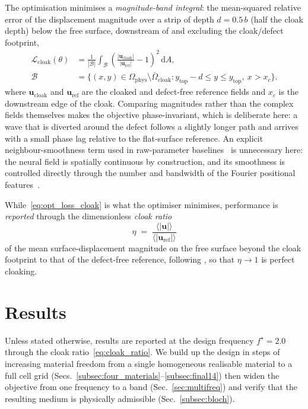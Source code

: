 \documentclass[preprint,12pt]{elsarticle}
\newcommand{\mbf}[1]{\mathbf{#1}}
\newcommand{\be}{\begin{equation}}
\newcommand{\ee}{\end{equation}}
\newcommand{\mcl}[1]{\mathcal{#1}}
\begin{document}
The optimisation minimises a
\emph{magnitude-band integral}: the mean-squared relative error of the
displacement magnitude over a strip of depth $d=0.5\,b$ (half the cloak
depth) below the free surface, downstream of and excluding the
cloak/defect footprint,
\begin{subequations}\label{eq:opt_loss_cloak}
\begin{align}
  \mcl{L}_{\mathrm{cloak}}(\theta)
  &= \frac{1}{|\mcl{B}|}\int_{\mcl{B}}
      \left(\frac{|\mbf{u}_{\mathrm{cloak}}|}{|\mbf{u}_{\mathrm{ref}}|}-1\right)^{2}
      \,\mathrm{d}A, \label{eq:opt_loss_cloak_L}\\
  \mcl{B}&=\bigl\{(x,y)\in\Omega_{\mathrm{phys}}\setminus\overline{\Omega}_{\mathrm{cloak}}
     : y_{\mathrm{top}}-d\le y\le y_{\mathrm{top}},\ x>x_c\bigr\}.
     \label{eq:opt_loss_cloak_B}
\end{align}
\end{subequations}
where $\mbf{u}_{\mathrm{cloak}}$ and $\mbf{u}_{\mathrm{ref}}$ are the
cloaked and defect-free reference fields and $x_c$ is the downstream edge
of the cloak. Comparing magnitudes rather than the complex fields
themselves makes the objective phase-invariant, which is deliberate here: a wave
that is diverted around the defect follows a slightly longer path and
arrives with a small phase lag relative to the flat-surface reference.
An explicit
neighbour-smoothness term used in raw-parameter
baselines~\citep{wang2022} is unnecessary here: the neural field is
spatially continuous by construction, and its smoothness is controlled
directly through the number and bandwidth of the Fourier positional
features~\citep{tancik2020fourier}.

While~\eqref{eq:opt_loss_cloak} is what the optimiser minimises, performance
is \emph{reported} through the dimensionless \emph{cloak ratio}
\be\label{eq:cloak_ratio}
  \eta \;=\;
  \frac{\langle|\mbf{u}|\rangle}{\langle|\mbf{u}_{\mathrm{ref}}|\rangle}
\ee
of the mean surface-displacement magnitude on the free surface beyond the
cloak footprint to that of the defect-free reference, following
\citet{chatzopoulos2023}, so that $\eta\to1$ is perfect cloaking.

\section{Results}\label{sec:results}

Unless stated otherwise, results are reported at the design frequency
$f^\star=2.0$ through the cloak ratio~\eqref{eq:cloak_ratio}. We build up
the design in steps of increasing material freedom from a single
homogeneous realisable material to a full cell grid
(Secs.~\ref{subsec:four_materials}--\ref{subsec:final14}) then widen the
objective from one frequency to a band (Sec.~\ref{sec:multifreq}) and verify
that the resulting medium is physically admissible
(Sec.~\ref{subsec:bloch}).
\end{document}
